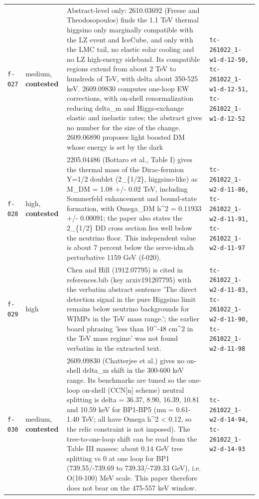 \documentclass[11pt,a4paper]{article}
\begin{document}
\begin{longtable}{@{}p{}p{}p{}p{}@{}}
\texttt{f-027} & medium, \textbf{contested} & Abstract-level only: 2610.03692 (Freese and Theodosopoulos) finds the 1.1 TeV thermal higgsino only marginally compatible with the LZ event and IceCube, and only with the LMC tail, no elastic solar cooling and no LZ high-energy sideband. Its compatible regions extend from about 2 TeV to hundreds of TeV, with delta about 350-525 keV. 2609.09830 computes one-loop EW corrections, with on-shell renormalization reducing delta\_m and Higgs-exchange elastic and inelastic rates; the abstract gives no number for the size of the change. 2609.06890 proposes light boosted DM whose energy is set by the dark & \texttt{tc-261022\_\allowbreak{}1-w1-d-12-50,\allowbreak{} tc-261022\_\allowbreak{}1-w1-d-12-51,\allowbreak{} tc-261022\_\allowbreak{}1-w1-d-12-52} \\
\texttt{f-028} & high, \textbf{contested} & 2205.04486 (Bottaro et al., Table I) gives the thermal mass of the Dirac-fermion Y=1/2 doublet (2\_\{1/2\}, higgsino-like) as M\_DM = 1.08 +/- 0.02 TeV, including Sommerfeld enhancement and bound-state formation, with Omega\_DM h\textasciicircum{}2 = 0.11933 +/- 0.00091; the paper also states the 2\_\{1/2\} DD cross section lies well below the neutrino floor. This independent value is about 7 percent below the serve-idm.sh perturbative 1159 GeV (f-020). & \texttt{tc-261022\_\allowbreak{}1-w2-d-11-86,\allowbreak{} tc-261022\_\allowbreak{}1-w2-d-11-91,\allowbreak{} tc-261022\_\allowbreak{}1-w2-d-11-97} \\
\texttt{f-029} & high & Chen and Hill (1912.07795) is cited in references.bib (key arxiv191207795) with the verbatim abstract sentence 'The direct detection signal in the pure Higgsino limit remains below neutrino backgrounds for WIMPs in the TeV mass range.'; the earlier board phrasing 'less than 10\textasciicircum{}-48 cm\textasciicircum{}2 in the TeV mass regime' was not found verbatim in the extracted text. & \texttt{tc-261022\_\allowbreak{}1-w2-d-11-83,\allowbreak{} tc-261022\_\allowbreak{}1-w2-d-11-90,\allowbreak{} tc-261022\_\allowbreak{}1-w2-d-11-98} \\
\texttt{f-030} & medium, \textbf{contested} & 2609.09830 (Chatterjee et al.) gives no on-shell delta\_m shift in the 300-600 keV range. Its benchmarks are tuned so the one-loop on-shell (CCN[n] scheme) neutral splitting is delta = 36.37, 8.90, 16.39, 10.81 and 10.59 keV for BP1-BP5 (\textbar{}mu\textbar{} = 0.61-1.40 TeV; all have Omega h\textasciicircum{}2 \textless{} 0.12, so the relic constraint is not imposed). The tree-to-one-loop shift can be read from the Table III masses: about 0.14 GeV tree splitting vs 0 at one loop for BP1 (739.55/-739.69 to 739.33/-739.33 GeV), i.e. O(10-100) MeV scale. This paper therefore does not bear on the 475-557 keV window. & \texttt{tc-261022\_\allowbreak{}1-w2-d-14-94,\allowbreak{} tc-261022\_\allowbreak{}1-w2-d-14-93} \\

\end{longtable}
\end{document}
